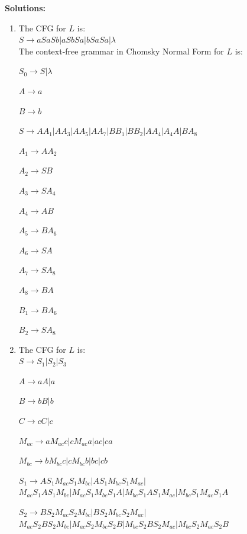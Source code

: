 \documentclass{article}%
\begin{document}
\begin{enumerate}
	\textbf{Solutions:}\\
	
\begin{enumerate}
	\item The CFG for $L$ is: \\
	
	$S \rightarrow aSaSb | aSbSa | bSaSa | \lambda$ \\
	
	
	The context-free grammar in Chomsky Normal Form for $L$ is:
	
	$S_0 \rightarrow S | \lambda$ 
	
	$A \rightarrow a$
	
	$B \rightarrow b$
	
	$S \rightarrow AA_1 | AA_3 | AA_5 | AA_7 | BB_1 | BB_2 | AA_4|A_4A|BA_8$
	
	$A_1 \rightarrow AA_2$
	
	$A_2 \rightarrow SB$ 
	
	$A_3 \rightarrow SA_4$
	
	$A_4 \rightarrow AB$ 
	
	$A_5 \rightarrow BA_6$
	
	$A_6 \rightarrow SA$
	
	$A_7 \rightarrow SA_8$
	
	$A_8 \rightarrow BA$
	
	$B_1 \rightarrow BA_6$
	
	$B_2 \rightarrow SA_8$
	
	\item The CFG for $L$ is: \\
	
	$S \rightarrow S_1 | S_2 | S_3$
	
	$A \rightarrow aA|a$
	
	$B \rightarrow bB|b$
	
	$C \rightarrow cC|c$
	
	$M_{ac} \rightarrow aM_{ac}c | cM_{ac}a | ac|ca$ 
	
	$M_{bc} \rightarrow bM_{bc}c | cM_{bc}b | bc|cb$ 
	
	$S_1 \rightarrow A S_1 M_{ac}S_1M_{bc}| A S_1 M_{bc}S_1M_{ac} | $ \\ 
	$M_{ac} S_1 A S_1 M_{bc} |M_{ac} S_1 M_{bc} S_1 A| M_{bc} S_1 A S_1 M_{ac} |M_{bc} S_1 M_{ac} S_1 A  $
	
	
	$S_2 \rightarrow B S_2 M_{ac}S_2M_{bc}| B S_2 M_{bc}S_2M_{ac} | $ \\ 
	$M_{ac} S_2 B S_2 M_{bc} |M_{ac} S_2 M_{bc} S_2 B| M_{bc} S_2 B S_2 M_{ac} |M_{bc} S_2 M_{ac} S_2 B  $
	

\end{enumerate}
\end{enumerate}
\end{document}
